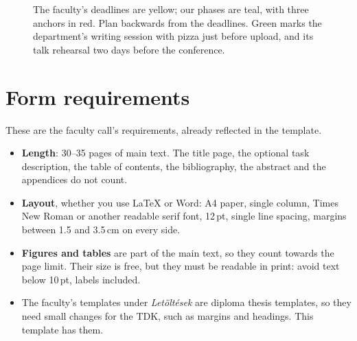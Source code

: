 \begin{figure}[!ht]
  \caption{The faculty's deadlines are yellow; our phases are teal, with three anchors in red. Plan backwards from the deadlines. Green marks the department's writing session with pizza just before upload, and its talk rehearsal two days before the conference.}\label{fig:timeline}
\end{figure}

\section{Form requirements}\label{app:tdk:form}
These are the faculty call's requirements, already reflected in the template.
\begin{itemize}
  \item \textbf{Length}: 30--35 pages of main text. The title page, the optional task description, the table of contents, the bibliography, the abstract and the appendices do not count.
  \item \textbf{Layout}, whether you use \LaTeX{} or Word: A4 paper, single column, Times New Roman or another readable serif font, 12\,pt, single line spacing, margins between 1.5 and 3.5\,cm on every side.
  \item \textbf{Figures and tables} are part of the main text, so they count towards the page limit. Their size is free, but they must be readable in print: avoid text below 10\,pt, labels included.
  \item The faculty's templates under \emph{Letöltések} are diploma thesis templates, so they need small changes for the TDK, such as margins and headings. This template has them.
\end{itemize}

